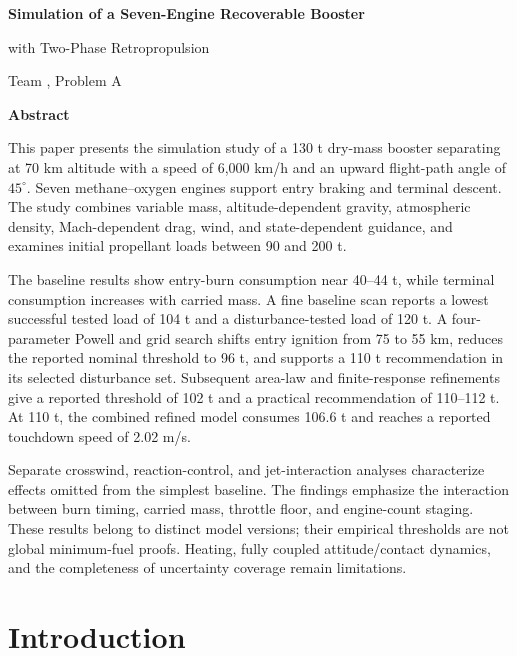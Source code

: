 \documentclass[11pt,a4paper]{article}
\begin{document}
\hypersetup{pageanchor=false}
\begin{center}
\vspace*{6mm}
{\LARGE\bfseries Simulation of a Seven-Engine Recoverable Booster\par with Two-Phase Retropropulsion\par}
\vspace{5mm}
{\large Team \TeamNumber, Problem A\par}
\vspace{6mm}
{\large\bfseries Abstract\par}
\end{center}
\noindent
This paper presents the simulation study of a 130 t dry-mass booster separating at 70 km altitude with a speed of 6,000 km/h and an upward flight-path angle of $45^\circ$. Seven methane--oxygen engines support entry braking and terminal descent. The study combines variable mass, altitude-dependent gravity, atmospheric density, Mach-dependent drag, wind, and state-dependent guidance, and examines initial propellant loads between 90 and 200 t.

The baseline results show entry-burn consumption near 40--44 t, while terminal consumption increases with carried mass. A fine baseline scan reports a lowest successful tested load of 104 t and a disturbance-tested load of 120 t. A four-parameter Powell and grid search shifts entry ignition from 75 to 55 km, reduces the reported nominal threshold to 96 t, and supports a 110 t recommendation in its selected disturbance set. Subsequent area-law and finite-response refinements give a reported threshold of 102 t and a practical recommendation of 110--112 t. At 110 t, the combined refined model consumes 106.6 t and reaches a reported touchdown speed of 2.02 m/s.

Separate crosswind, reaction-control, and jet-interaction analyses characterize effects omitted from the simplest baseline. The findings emphasize the interaction between burn timing, carried mass, throttle floor, and engine-count staging. These results belong to distinct model versions; their empirical thresholds are not global minimum-fuel proofs. Heating, fully coupled attitude/contact dynamics, and the completeness of uncertainty coverage remain limitations.
\clearpage
\hypersetup{pageanchor=true}
{\small\tableofcontents}
\clearpage
{}

\section{Introduction}
\end{document}
